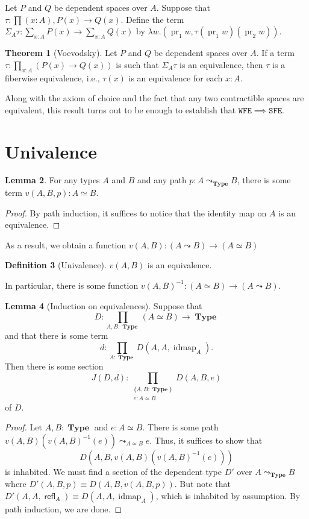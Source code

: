 \documentclass[10pt,letterpaper,cm]{nupset}
\theoremstyle{definition}
\newtheorem{definition}{Definition}[subsection]
\theoremstyle{theorem}
\newtheorem{theorem}[definition]{Theorem}
\newtheorem{lemma}[definition]{Lemma}
\theoremstyle{remark}
\newcommand{\1}{\mathbf{1}}
\newcommand{\wfe}{\mathtt{WFE}}
\newcommand{\sfe}{\mathtt{SFE}}
\newcommand{\0}{\vec 0}
\DeclareMathOperator{\idmap}{idmap}
\DeclareMathOperator{\refl}{\mathsf{refl}}
\DeclareMathOperator{\pr}{pr}
\DeclareMathOperator{\type}{\mathbf{Type}}
\begin{document}
\smallskip

Let $P$ and $Q$ be dependent spaces over $A$. Suppose that $\tau : \prod(x:A), P(x) \to Q(x)$. Define the term $\Sigma_A\tau : \sum_{x:A}P(x) \to \sum_{x:A} Q(x)$ by $\lambda w. (\pr_1 w, \tau(\pr_1w)(\pr_2w))$.


\begin{theorem}[Voevodsky]
Let $P$ and $Q$ be dependent spaces over $A$. If a term $\tau : \prod_{x:A}\left(P(x) \to Q(x)\right)$ is such that $\Sigma_A \tau$ is an equivalence, then $\tau$ is a fiberwise equivalence, i.e., $\tau(x)$ is an equivalence for each $x:A$. 
\end{theorem}

Along with the axiom of choice and the fact that any two contractible spaces are equivalent, this result turns out to be enough to establish that $\wfe \implies \sfe$.


\section{Univalence}

\begin{lemma}
For any types $A$ and $B$ and any path $p: A \leadsto_{\type} B$, there is some term $v(A, B, p) : A \simeq B$.  
\end{lemma}
\begin{proof}
By path induction, it suffices to notice that the identity map on $A$ is an equivalence.
\end{proof}

As a result, we obtain a function $v(A, B) : \left(A \leadsto B\right) \to \left(A \simeq B\right)$

\begin{definition}[Univalence]
 $v(A, B)$ is an equivalence. 
\end{definition}

In particular, there is some function $v(A, B) ^{{-}1}: \left(A \simeq B\right) \to \left(A \leadsto B\right)$.

\smallskip

\begin{lemma}[Induction on equivalences] 
Suppose that $$D: \prod_{A, B : \type}\left(A \simeq B\right) \to \type$$ and that there is some term $$d: \prod_{A: \type}D(A, A, \idmap_A).$$ Then there is some section  $$J(D, d)  :  \prod_{\substack{\{A,B:\type\} \\ e:A\simeq B}} D(A,B,e) $$ of $D$. 
\end{lemma}
\begin{proof}
Let $A,B: \type$ and $e: A \simeq B$. There is some path $v(A,B)(v(A,B)^{{-}1}(e))\leadsto_{A\simeq B} e$. Thus, it suffices to show that $$D(A, B, v(A,B)(v(A,B)^{{-}1}(e)))$$ is inhabited. We must  find a section of the dependent type $D'$ over $A\leadsto_{\type} B$ where $D'(A, B, p) \equiv D(A, B, v(A, B, p))$. But note that $D'(A, A, \refl_A) \equiv D(A, A, \idmap_A)$, which is inhabited by assumption. By path induction, we are done.
\end{proof}
\end{document}
